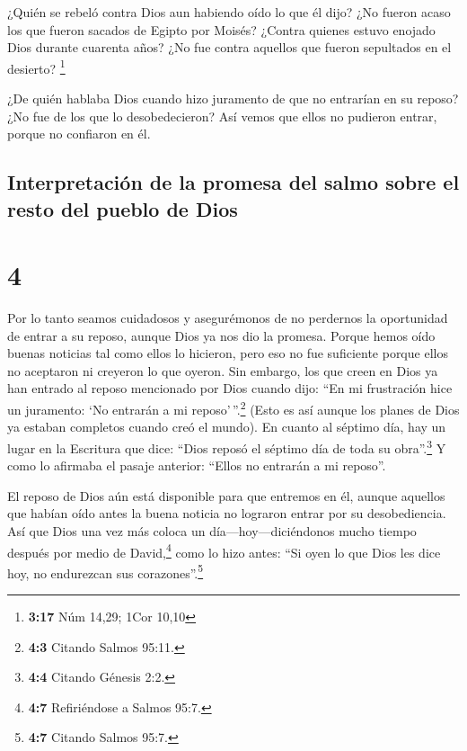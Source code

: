  ¿Quién se rebeló contra Dios aun habiendo oído lo que él
dijo? ¿No fueron acaso los que fueron sacados de Egipto por Moisés?
 ¿Contra quienes estuvo enojado Dios durante cuarenta
años? ¿No fue contra aquellos que fueron sepultados en el desierto?
\footnote{\textbf{3:17} Núm 14,29; 1Cor 10,10}

 ¿De quién hablaba Dios cuando hizo juramento de que no
entrarían en su reposo? ¿No fue de los que lo desobedecieron?
 Así vemos que ellos no pudieron entrar, porque no
confiaron en él.

\hypertarget{interpretaciuxf3n-de-la-promesa-del-salmo-sobre-el-resto-del-pueblo-de-dios}{%
\subsection{Interpretación de la promesa del salmo sobre el resto del
pueblo de
Dios}\label{interpretaciuxf3n-de-la-promesa-del-salmo-sobre-el-resto-del-pueblo-de-dios}}

\hypertarget{section-3}{%
\section{4}\label{section-3}}

 Por lo tanto seamos cuidadosos y asegurémonos de no
perdernos la oportunidad de entrar a su reposo, aunque Dios ya nos dio
la promesa.  Porque hemos oído buenas noticias tal como
ellos lo hicieron, pero eso no fue suficiente porque ellos no aceptaron
ni creyeron lo que oyeron.  Sin embargo, los que creen en
Dios ya han entrado al reposo mencionado por Dios cuando dijo: ``En mi
frustración hice un juramento: `No entrarán a mi reposo'\,''.\footnote{\textbf{4:3}
  Citando Salmos 95:11.} (Esto es así aunque los planes de Dios ya
estaban completos cuando creó el mundo).  En cuanto al
séptimo día, hay un lugar en la Escritura que dice: ``Dios reposó el
séptimo día de toda su obra''.\footnote{\textbf{4:4} Citando Génesis
  2:2.}  Y como lo afirmaba el pasaje anterior: ``Ellos no
entrarán a mi reposo''.

 El reposo de Dios aún está disponible para que entremos
en él, aunque aquellos que habían oído antes la buena noticia no
lograron entrar por su desobediencia.  Así que Dios una
vez más coloca un día---hoy---diciéndonos mucho tiempo después por medio
de David,\footnote{\textbf{4:7} Refiriéndose a Salmos 95:7.} como lo
hizo antes: ``Si oyen lo que Dios les dice hoy, no endurezcan sus
corazones''.\footnote{\textbf{4:7} Citando Salmos 95:7.}

